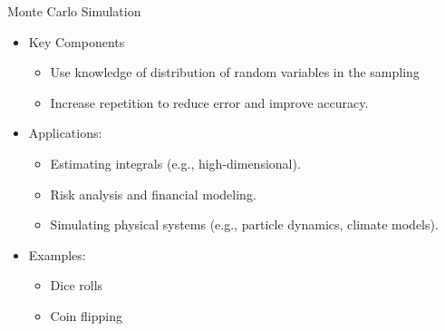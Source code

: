 \documentclass[10pt]{beamer}
\begin{document}
\begin{frame}{Monte Carlo Simulation}

{}

\begin{itemize}
    \item Key Components
        \begin{itemize}
            \item Use knowledge of distribution of random variables in the sampling
            \item Increase repetition to reduce error and improve accuracy.
        \end{itemize}
    \item Applications:
        \begin{itemize}
            \item Estimating integrals (e.g., high-dimensional).
            \item Risk analysis and financial modeling.
            \item Simulating physical systems (e.g., particle dynamics, climate models).
        \end{itemize}
    \item Examples:
        \begin{itemize}
            \item Dice rolls 
            \item Coin flipping
        \end{itemize}
\end{itemize}

    
\end{frame}
\end{document}
